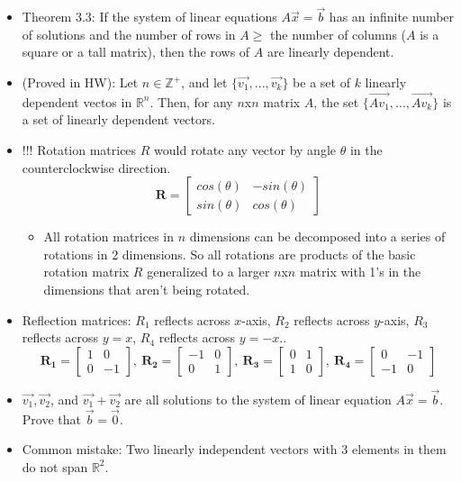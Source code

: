 \documentclass{article}
\begin{document}
\begin{itemize}
	\item Theorem 3.3: If the system of linear equations $A\vec{x} = \vec{b}$ has an infinite number of solutions and the number of rows in $A\geq$ the number of columns ($A$ is a square or a tall matrix), then the rows of $A$ are linearly dependent.
	\item (Proved in HW): Let $n\in\mathbb{Z^+}$, and let $\{\vec{v_1},...,\vec{v_k}\}$ be a set of $k$ linearly dependent vectos in $\mathbb{R}^n.$ Then, for any $n$x$n$ matrix $A$, the set $\{\vec{Av_1},...,\vec{Av_k}\}$ is a set of linearly dependent vectors.
	\item {\color{red}!!! Rotation matrices} $R$ would rotate any vector by angle $\theta$ in the counterclockwise direction.
	\[ \mathbf{R} = 
	\begin{bmatrix}
    	cos(\theta) & -sin(\theta) \\
    	sin(\theta) & cos(\theta)
	\end{bmatrix}
	\]
	\begin{itemize}
		\item All rotation matrices in $n$ dimensions can be decomposed into a series of rotations in 2 dimensions. So all rotations are products of the basic rotation matrix $R$ generalized to a larger $n$x$n$ matrix with 1’s in the dimensions that aren’t being rotated. 
	\end{itemize}
	\item Reflection matrices: $R_1$ reflects across $x$-axis, $R_2$ reflects across $y$-axis, $R_3$ reflects across $y = x$, $R_4$ reflects across $y = -x$..
	\[ \mathbf{R_1} = 
	\begin{bmatrix}
    	1 & 0 \\
    	0 & -1
	\end{bmatrix},\ 
	\mathbf{R_2} = 
	\begin{bmatrix}
    	-1 & 0 \\
    	0 & 1
	\end{bmatrix},\ 
	\mathbf{R_3} = 
	\begin{bmatrix}
    	0 & 1 \\
    	1 & 0
	\end{bmatrix},\ 
	\mathbf{R_4} = 
	\begin{bmatrix}
    	0 & -1 \\
    	-1 & 0
	\end{bmatrix}
	\]
	\item $\vec{v_1}, \vec{v_2}$, and $\vec{v_1} + \vec{v_2}$ are all solutions to the system of linear equation $A\vec{x} = \vec{b}.$ Prove that $\vec{b} = \vec{0}.$
	\item {\color{red} Common mistake:} Two linearly independent vectors with 3 elements in them do not span $\mathbb{R}^2$.
\end{itemize}
\end{document}
